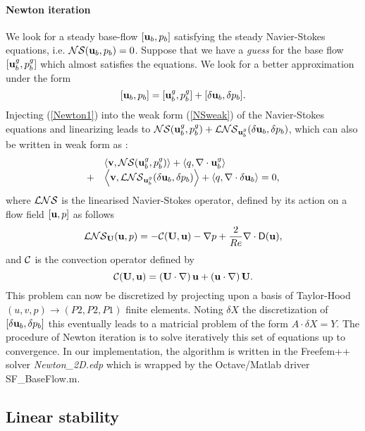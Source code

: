 \documentclass[twocolumn,10pt]{asme2ej}
\newcommand{\be}[1]{ \begin{equation} \label{#1}}
\newcommand{\ee}{\end{equation}}
\newcommand{\bes}[1]{ \begin{equation} \label{#1}\begin{array}{rl}}
\newcommand{\ees}{\end{array}\end{equation}}
\begin{document}
\paragraph{Newton iteration}


We look for a steady base-flow $[{\bf u}_b,p_b]$ satisfying the steady Navier-Stokes equations, i.e. 
${\cal NS} ({\bf u}_b,p_b) = 0$.
Suppose that we have a {\em guess}  for the base flow $[{\bf u}_b^g,p_b^g]$  which almost satisfies the equations.  We look for a better approximation under the form
\be{Newton1}
[{\bf u}_b,p_b]  = [{\bf u}_b^g,p_b^g] + [\delta {\bf u}_b, \delta p_b].
\ee
Injecting (\ref{Newton1}) into the weak form (\ref{NSweak}) of the Navier-Stokes equations and linearizing leads to  
${\cal NS}  ({\bf u}_b^g,p_b^g) +  {\cal LNS} _{{\bf u}_b^g}(\delta {\bf u}_b,\delta p_b)$, which can also be written in weak form as :
\bes{Newton2}
&\left< {\bf v}, {\cal NS} ({\bf u}_b^g,p_b^g)\right> + \left<q, \nabla \cdot {\bf u}_b^g\right>  
\\
+ &\left< { \bf v}, {\cal LNS} _{{\bf u}_b^g}( \delta {\bf u}_b,\delta p_b) \right> + \left<q, \nabla \cdot \delta{\bf u}_b\right> = 0,
\ees
where ${\cal LNS}$ is the linearised Navier-Stokes operator, defined by its action on a flow field $[{\bf u} , p]$ as follows 
\be{defNSL}
 {\cal LNS}_{{\bf U}}( {\bf u}, p) = - {\cal C}( {\bf U} , {\bf u}) -\nabla p
+\frac{2}{Re} \nabla  \cdot {\mathsf{D}}({\bf u}), %
 \ee
and ${\cal C}$ is the convection operator defined by 
\be{defC}
{\cal C}( {\bf U} , {\bf u}) = \left( {\bf U} \cdot \nabla \right) {\bf u} + \left( {\bf u} \cdot \nabla \right)  {\bf U}.
\ee
This problem can now be discretized by projecting upon a basis of Taylor-Hood $(u,v,p) \rightarrow (P2,P2,P1)$ finite elements. Noting $\delta X$ the discretization of $[\delta {\bf u}_b,\delta p_b]$ this eventually leads to a matricial problem of the form $A \cdot \delta X = Y$. The procedure of Newton iteration is to solve iteratively this set of equations up to convergence.
In our implementation, the algorithm is written in the Freefem++ solver {\em Newton\_2D.edp} 
which is wrapped by the Octave/Matlab driver {\sf SF\_BaseFlow.m}.

\subsection{Linear stability}
\vspace{.2cm}
\end{document}
